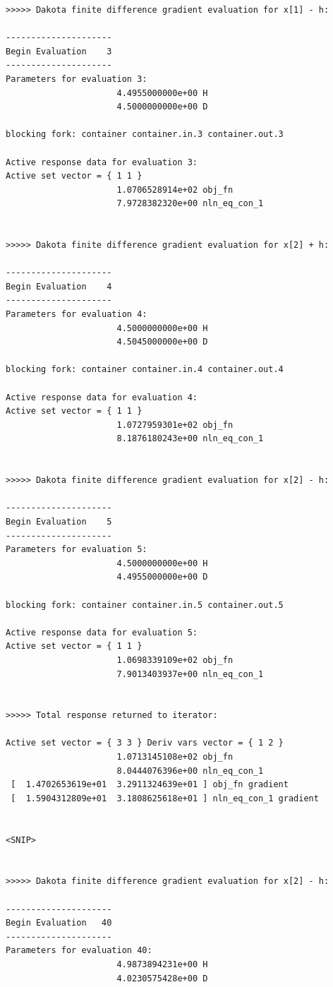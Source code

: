 \begin{small}
\begin{verbatim}
>>>>> Dakota finite difference gradient evaluation for x[1] - h:

---------------------
Begin Evaluation    3
---------------------
Parameters for evaluation 3:
                      4.4955000000e+00 H
                      4.5000000000e+00 D

blocking fork: container container.in.3 container.out.3

Active response data for evaluation 3:
Active set vector = { 1 1 }
                      1.0706528914e+02 obj_fn
                      7.9728382320e+00 nln_eq_con_1


>>>>> Dakota finite difference gradient evaluation for x[2] + h:

---------------------
Begin Evaluation    4
---------------------
Parameters for evaluation 4:
                      4.5000000000e+00 H
                      4.5045000000e+00 D

blocking fork: container container.in.4 container.out.4

Active response data for evaluation 4:
Active set vector = { 1 1 }
                      1.0727959301e+02 obj_fn
                      8.1876180243e+00 nln_eq_con_1


>>>>> Dakota finite difference gradient evaluation for x[2] - h:

---------------------
Begin Evaluation    5
---------------------
Parameters for evaluation 5:
                      4.5000000000e+00 H
                      4.4955000000e+00 D

blocking fork: container container.in.5 container.out.5

Active response data for evaluation 5:
Active set vector = { 1 1 }
                      1.0698339109e+02 obj_fn
                      7.9013403937e+00 nln_eq_con_1


>>>>> Total response returned to iterator:

Active set vector = { 3 3 } Deriv vars vector = { 1 2 }
                      1.0713145108e+02 obj_fn
                      8.0444076396e+00 nln_eq_con_1
 [  1.4702653619e+01  3.2911324639e+01 ] obj_fn gradient
 [  1.5904312809e+01  3.1808625618e+01 ] nln_eq_con_1 gradient


<SNIP>


>>>>> Dakota finite difference gradient evaluation for x[2] - h:

---------------------
Begin Evaluation   40
---------------------
Parameters for evaluation 40:
                      4.9873894231e+00 H
                      4.0230575428e+00 D


\end{verbatim}
\end{small}
